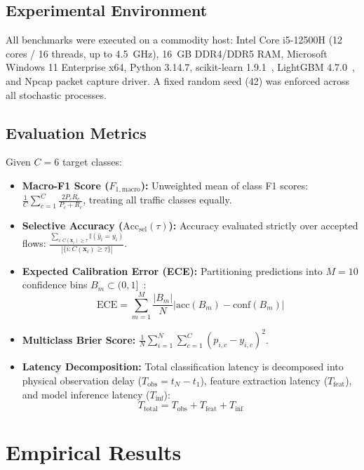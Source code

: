 \documentclass[conference]{IEEEtran}
\begin{document}
\subsection{Experimental Environment}
All benchmarks were executed on a commodity host: Intel Core i5-12500H (12 cores / 16 threads, up to 4.5~GHz), 16~GB DDR4/DDR5 RAM, Microsoft Windows 11 Enterprise x64, Python 3.14.7, scikit-learn 1.9.1~\cite{pedregosa2011scikit}, LightGBM 4.7.0~\cite{ke2017lightgbm}, and Npcap packet capture driver. A fixed random seed (42) was enforced across all stochastic processes.

\subsection{Evaluation Metrics}
Given $C=6$ target classes:
\begin{itemize}
    \item \textbf{Macro-F1 Score ($F_{1,\text{macro}}$):} Unweighted mean of class F1 scores: $\frac{1}{C}\sum_{c=1}^C \frac{2 P_c R_c}{P_c + R_c}$, treating all traffic classes equally.
    \item \textbf{Selective Accuracy ($\text{Acc}_{\text{sel}}(\tau)$):} Accuracy evaluated strictly over accepted flows: $\frac{\sum_{i: C(\mathbf{x}_i) \ge \tau} \mathbb{I}(\hat{y}_i = y_i)}{|\{i : C(\mathbf{x}_i) \ge \tau\}|}$.
    \item \textbf{Expected Calibration Error (ECE):} Partitioning predictions into $M=10$ confidence bins $B_m \subset (0, 1]$~\cite{guo2017calibration}:
    \begin{equation}
        \text{ECE} = \sum_{m=1}^M \frac{|B_m|}{N} \left| \text{acc}(B_m) - \text{conf}(B_m) \right|
    \end{equation}
    \item \textbf{Multiclass Brier Score:} $\frac{1}{N}\sum_{i=1}^N \sum_{c=1}^C (p_{i,c} - y_{i,c})^2$.
    \item \textbf{Latency Decomposition:} Total classification latency is decomposed into physical observation delay ($T_{\text{obs}} = t_N - t_1$), feature extraction latency ($T_{\text{feat}}$), and model inference latency ($T_{\text{inf}}$):
    \begin{equation}
        T_{\text{total}} = T_{\text{obs}} + T_{\text{feat}} + T_{\text{inf}}
    \end{equation}
\end{itemize}

\section{Empirical Results}
\label{sec:results}
\end{document}

